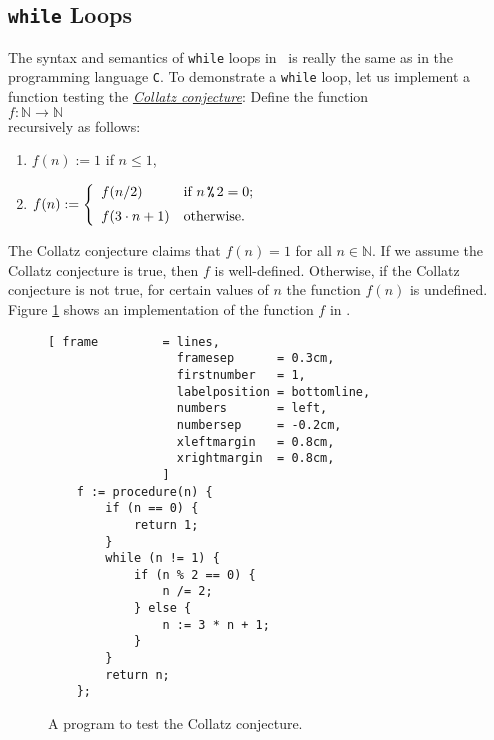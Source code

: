 \subsection{\texttt{while} Loops}
The syntax and semantics of \texttt{while} loops in \setlx\ is really the same as in the programming
language \texttt{C}.  To demonstrate a \texttt{while} loop,
let us implement a function testing the 
\href{http://en.wikipedia.org/wiki/Collatz_conjecture}{\emph{Collatz conjecture}}:  Define the function
\\[0.2cm]
\hspace*{1.3cm}
$f: \mathbb{N} \rightarrow \mathbb{N}$
\\[0.2cm]
recursively as follows:
\begin{enumerate}
\item $f(n) := 1$ \hspace*{2.13cm} if $n \leq 1$,
\item $f(n) := \left\{
       \begin{array}[c]{ll}
         f(n/2)           & \mbox{if $n \,\texttt{\symbol{37}}\, 2 = 0$;} \\[0.2cm]  
         f(3 \cdot n + 1) & \mbox{otherwise.} 
       \end{array}
       \right.
      $ 
\end{enumerate}
The Collatz conjecture claims that $f(n) = 1$  for all $n \in \mathbb{N}$. 
If we assume the Collatz conjecture is true, then $f$ is well-defined.
Otherwise, if the Collatz conjecture is not true, for certain values of $n$ the function $f(n)$ is undefined.
Figure \ref{fig:ulam.stlx} shows an implementation of the function $f$ in \setlx.  

\begin{figure}[!ht]
\centering
\begin{Verbatim}[ frame         = lines, 
                  framesep      = 0.3cm, 
                  firstnumber   = 1,
                  labelposition = bottomline,
                  numbers       = left,
                  numbersep     = -0.2cm,
                  xleftmargin   = 0.8cm,
                  xrightmargin  = 0.8cm,
                ]
    f := procedure(n) {
        if (n == 0) {
            return 1;   
        }
        while (n != 1) {
            if (n % 2 == 0) {
                n /= 2;
            } else {
                n := 3 * n + 1;
            }
        }
        return n;
    };
\end{Verbatim}
\vspace*{-0.3cm}
\caption{A program to test the Collatz conjecture.}
\label{fig:ulam.stlx}
\end{figure}

